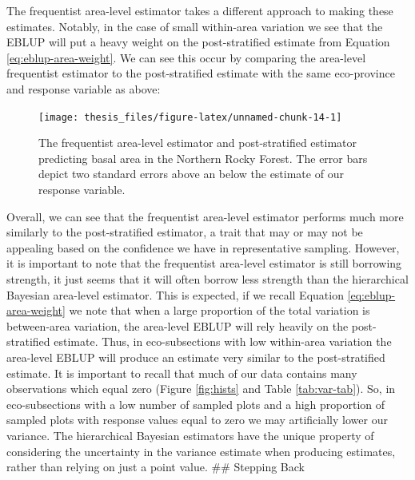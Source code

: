\documentclass[12pt,twoside]{reedthesis}
\begin{document}
The frequentist area-level estimator takes a different approach to making these estimates. Notably, in the case of small within-area variation we see that the EBLUP will put a heavy weight on the post-stratified estimate from Equation \eqref{eq:eblup-area-weight}. We can see this occur by comparing the area-level frequentist estimator to the post-stratified estimate with the same eco-province and response variable as above:
\begin{figure}

{\centering \texttt{[image: thesis\_files/figure-latex/unnamed-chunk-14-1]} 

}

\caption[EBLUP area-level and Post-stratified estimates in M333]{The frequentist area-level estimator and post-stratified estimator predicting basal area in the Northern Rocky Forest. The error bars depict two standard errors above an below the estimate of our response variable.}\label{fig:unnamed-chunk-14}
\end{figure}
Overall, we can see that the frequentist area-level estimator performs much more similarly to the post-stratified estimator, a trait that may or may not be appealing based on the confidence we have in representative sampling. However, it is important to note that the frequentist area-level estimator is still borrowing strength, it just seems that it will often borrow less strength than the hierarchical Bayesian area-level estimator. This is expected, if we recall Equation \eqref{eq:eblup-area-weight} we note that when a large proportion of the total variation is between-area variation, the area-level EBLUP will rely heavily on the post-stratified estimate. Thus, in eco-subsections with low within-area variation the area-level EBLUP will produce an estimate very similar to the post-stratified estimate. It is important to recall that much of our data contains many observations which equal zero (Figure \ref{fig:hists} and Table \ref{tab:var-tab}). So, in eco-subsections with a low number of sampled plots and a high proportion of sampled plots with response values equal to zero we may artificially lower our variance. The hierarchical Bayesian estimators have the unique property of considering the uncertainty in the variance estimate when producing estimates, rather than relying on just a point value.
\clearpage
\#\# Stepping Back
\end{document}
